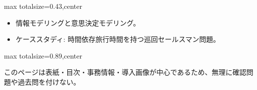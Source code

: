 \clearpage
{}
\begin{minipage}[t]{0.405\textwidth}
\begin{adjustbox}{max totalsize={\textwidth}{0.43\textheight},center}
\begin{minipage}{\textwidth}\scriptsize
{}\begin{itemize}
\item 情報モデリングと意思決定モデリング。
\item ケーススタディ: 時間依存旅行時間を持つ巡回セールスマン問題。
\end{itemize}
\end{minipage}
\end{adjustbox}
\end{minipage}\hfill
\begin{minipage}[t]{0.58\textwidth}
\begin{adjustbox}{max totalsize={\textwidth}{0.89\textheight},center}
\begin{minipage}{\textwidth}\scriptsize
{}このページは表紙・目次・事務情報・導入画像が中心であるため、無理に確認問題や過去問を付けない。
\end{minipage}
\end{adjustbox}
\end{minipage}


